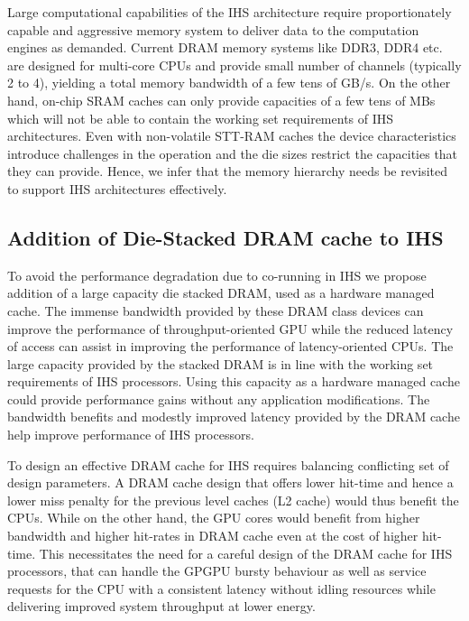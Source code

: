 \par Large computational capabilities of the IHS architecture require proportionately capable and aggressive memory system to deliver data to the computation engines as demanded. Current DRAM memory systems like DDR3, DDR4 etc. are designed for multi-core CPUs and provide small number of channels (typically 2 to 4), yielding a total memory bandwidth of a few tens of GB/s. On the other hand, on-chip SRAM caches can only provide capacities of a few tens of MBs which will not be able to contain the working set requirements of IHS architectures. Even with non-volatile STT-RAM caches the device characteristics introduce challenges in the operation and the die sizes restrict the capacities that they can provide. Hence, we infer that the memory hierarchy needs be revisited to support IHS architectures effectively.


\subsection{Addition of Die-Stacked DRAM cache to IHS}
To avoid the performance degradation due to co-running in IHS we propose addition of a large capacity die stacked DRAM, used as a hardware managed cache. The immense bandwidth provided by these DRAM class devices can improve the performance of throughput-oriented GPU while the reduced latency of access can assist in improving the performance of latency-oriented CPUs. The large capacity provided by the stacked DRAM is in line with the working set requirements of IHS processors. Using this capacity as a hardware managed cache could provide performance gains without any application modifications. The bandwidth benefits and modestly improved latency provided by the DRAM cache help improve performance of IHS processors. 
\par To design an effective DRAM cache for IHS requires balancing conflicting set of design parameters. A DRAM cache design that offers lower hit-time and hence a lower miss penalty for the previous level caches (L2 cache) would thus benefit the CPUs. While on the other hand, the GPU cores would benefit from higher bandwidth and higher hit-rates in DRAM cache even at the cost of higher hit-time. This necessitates the need for a careful design of the DRAM cache for IHS processors, that can handle the GPGPU bursty behaviour as well as service requests for the CPU with a consistent latency without idling resources while delivering improved system throughput at lower energy.

